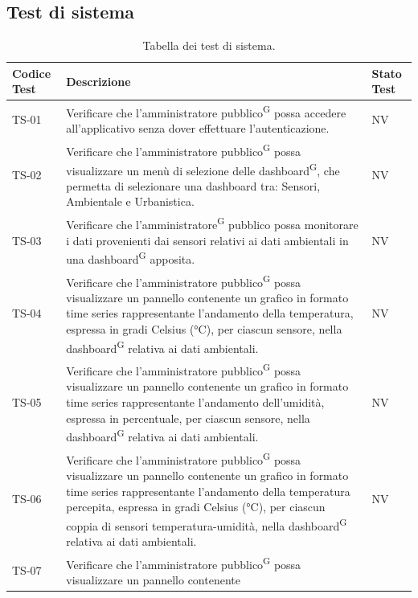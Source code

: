 \documentclass[8pt]{article}
\newcommand{\glossterm}[1]{#1\textsuperscript{G}} %
\begin{document}
\subsection{Test di sistema}
\renewcommand{\arraystretch}{2.5}
\begin{longtable}{|>{\centering}p{2cm}|>{\RaggedRight}m{12cm}|>{\centering\arraybackslash}p{2cm}|}
    \hline
    \rowcolor{white}
    \textbf{Codice Test} & \textbf{Descrizione} & \textbf{Stato Test} \\
    \hline
    \endfirsthead 
    \rowcolor{white}
    \caption{Tabella dei test di sistema.} 
    \label{table:Tabella dei test di sistema}
    \endlastfoot 
    TS-01 & Verificare che l’\glossterm{amministratore pubblico} possa accedere all’applicativo
    senza dover effettuare l’autenticazione. & NV\\
    \hline
    TS-02 & Verificare che l’\glossterm{amministratore pubblico} possa visualizzare un menù di selezione delle
    \glossterm{dashboard}, che permetta di selezionare una dashboard tra: Sensori, Ambientale e Urbanistica. & NV\\
    \hline
    TS-03 & Verificare che l’\glossterm{amministratore} pubblico possa monitorare i dati provenienti
    dai sensori relativi ai dati ambientali in una \glossterm{dashboard} apposita.
    & NV \\
    \hline
    TS-04 & Verificare che l’\glossterm{amministratore pubblico} possa visualizzare un pannello
    contenente un grafico in formato time series rappresentante l'andamento della temperatura,
    espressa in gradi Celsius (°C), per ciascun sensore, nella \glossterm{dashboard} relativa ai dati ambientali.
    & NV \\
    \hline
    TS-05 & Verificare che l’\glossterm{amministratore pubblico} possa visualizzare un pannello
    contenente un grafico in formato time series rappresentante l'andamento dell'umidità, espressa
    in percentuale, per ciascun sensore, nella \glossterm{dashboard} relativa ai dati ambientali.
    & NV \\
    \hline
    TS-06 &  Verificare che l’\glossterm{amministratore pubblico} possa visualizzare un pannello
    contenente un grafico in formato time series rappresentante l'andamento della temperatura
    percepita,
    espressa in gradi Celsius (°C), per ciascun coppia di sensori temperatura-umidità, nella
    \glossterm{dashboard} relativa ai dati ambientali.
    & NV \\
    \hline
    TS-07 & 
    Verificare che l’\glossterm{amministratore pubblico} possa visualizzare un pannello contenente

\end{longtable}
\end{document}
